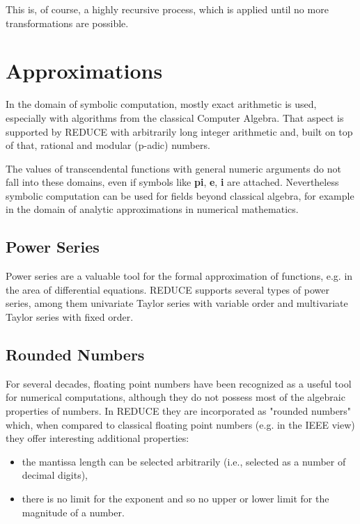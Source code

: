 This is, of course, a highly recursive process, which is applied until no
more transformations are possible.
\section{Approximations}
 
In the domain of symbolic computation, mostly exact arithmetic is used,
especially with algorithms from the classical Computer Algebra.  That
aspect is supported by {\small REDUCE} with arbitrarily long integer
arithmetic and, built on top of that, rational and modular (p-adic)
numbers.

The values of transcendental functions with general numeric arguments do
not fall into these domains, even if symbols like  {\bf pi}, {\bf e}, {\bf i}
are attached.  Nevertheless symbolic computation can be used for fields beyond
classical algebra, for example in the domain of analytic approximations in
numerical mathematics.

\subsection{Power Series}

Power series are a valuable tool for the formal approximation of
functions, e.g. in the area of differential equations. {\small REDUCE}
supports several types of power series, among them univariate Taylor
series with variable order and multivariate Taylor series with fixed
order.

\subsection{Rounded Numbers}
 
For several decades, floating point numbers have been recognized as a
useful tool for numerical computations, although they do not possess most
of the algebraic properties of numbers.  In {\small REDUCE} they are
incorporated as "rounded numbers" which, when compared to classical
floating point numbers (e.g. in the IEEE view) they offer interesting
additional properties:

\begin{itemize}
\item  the mantissa length can be selected
arbitrarily (i.e., selected as a number of decimal digits),
\item there is no limit for the exponent and so no
upper or lower limit for the magnitude of a number.
\end{itemize}
 
